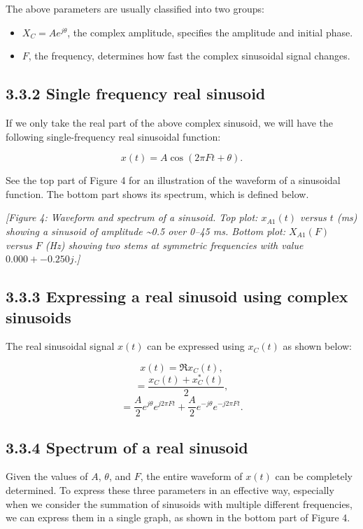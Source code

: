 \documentclass[11pt]{article}
\begin{document}
The above parameters are usually classified into two groups:

\begin{itemize}
  \item $X_C = A e^{j\theta}$, the complex amplitude, specifies the amplitude and initial phase.
  \item $F$, the frequency, determines how fast the complex sinusoidal signal changes.
\end{itemize}

\subsection*{3.3.2 Single frequency real sinusoid}

If we only take the real part of the above complex sinusoid, we will have the following single-frequency real sinusoidal function:

\[x(t) = A\cos(2\pi F t + \theta).\]

See the top part of Figure 4 for an illustration of the waveform of a sinusoidal function. The bottom part shows its spectrum, which is defined below.

\textit{[Figure 4: Waveform and spectrum of a sinusoid. Top plot: $x_{A1}(t)$ versus $t$ (ms) showing a sinusoid of amplitude \textasciitilde{}0.5 over 0–45 ms. Bottom plot: $X_{A1}(F)$ versus $F$ (Hz) showing two stems at symmetric frequencies with value $0.000 + -0.250j$.]}

\subsection*{3.3.3 Expressing a real sinusoid using complex sinusoids}

The real sinusoidal signal $x(t)$ can be expressed using $x_C(t)$ as shown below:

\[x(t) = \Re x_C(t),\]
\[= \frac{x_C(t) + x_C^*(t)}{2},\]
\[= \frac{A}{2} e^{j\theta} e^{j2\pi F t} + \frac{A}{2} e^{-j\theta} e^{-j2\pi F t}.\]

\subsection*{3.3.4 Spectrum of a real sinusoid}

Given the values of $A$, $\theta$, and $F$, the entire waveform of $x(t)$ can be completely determined. To express these three parameters in an effective way, especially when we consider the summation of sinusoids with multiple different frequencies, we can express them in a single graph, as shown in the bottom part of Figure 4.
\end{document}
